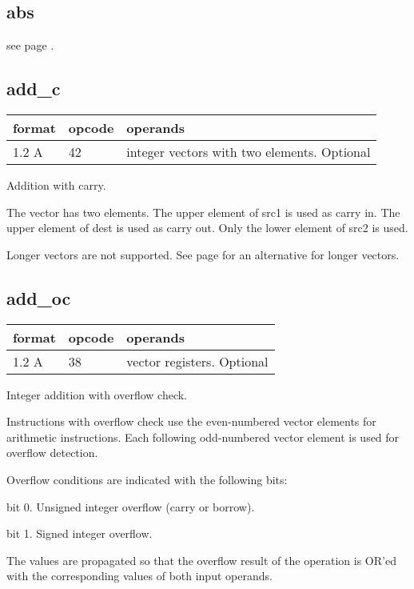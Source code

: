 \documentclass[forwardcom.tex]{subfiles}
\begin{document}
\subsection{abs}
see page \pageref{table:absInstruction}.
\vv

\subsection{add\_c}
\label{table:addCInstruction}
\begin{tabular}{|p{12mm}|p{15mm}|p{100mm}|}
\hline
\bfseries format & \bfseries opcode & \bfseries operands \\ \hline
1.2 A & 42 & integer vectors with two elements. Optional \\ \hline
\end{tabular}
\vv

Addition with carry.
\vv

The vector has two elements. The upper element of src1 is used as carry in. The upper element of dest is used as carry out. Only the lower element of src2 is used.
\vv

Longer vectors are not supported. See page 
\pageref{highPrecisionArithmetic} for an alternative for longer vectors.
\vv

\subsection{add\_oc}
\label{table:addOcInstruction}
\begin{tabular}{|p{12mm}|p{15mm}|p{100mm}|}
\hline
\bfseries format & \bfseries opcode & \bfseries operands \\ \hline
1.2 A & 38 & vector registers. Optional \\ \hline
\end{tabular}
\vv

Integer addition with overflow check.
\vv

Instructions with overflow check use the even-numbered vector elements for arithmetic instructions. Each following odd-numbered vector element is used for overflow detection.
\vv

Overflow conditions are indicated with the following bits:
\vv

bit 0. Unsigned integer overflow (carry or borrow).

bit 1. Signed integer overflow.
\vv

The values are propagated so that the overflow result of the operation is OR'ed with the corresponding values of both input operands.
\vv
\end{document}
